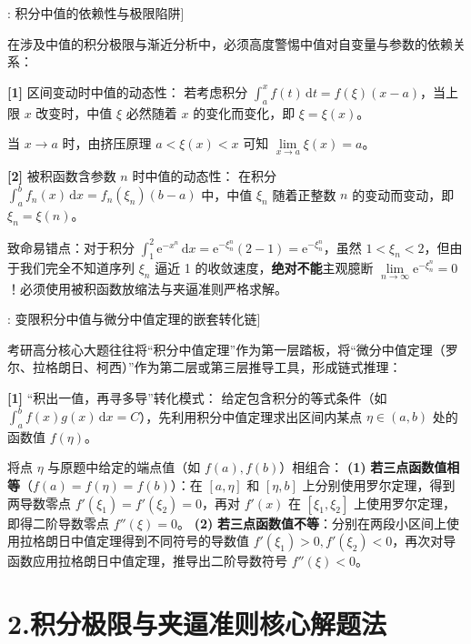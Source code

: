 \documentclass[11pt,a4paper,UTF8]{ctexart}
\begin{document}
\begin{thmbox}[辨析[1]: 积分中值的依赖性与极限陷阱]

在涉及中值的积分极限与渐近分析中，必须高度警惕中值对自变量与参数的依赖关系：

\textbf{[1]} 区间变动时中值的动态性：
若考虑积分 $\int_a^x f(t)\,\mathrm{d}t = f(\xi)(x - a)$，当上限 $x$ 改变时，中值 $\xi$ 必然随着 $x$ 的变化而变化，即 $\xi = \xi(x)$。

当 $x \to a$ 时，由挤压原理 $a < \xi(x) < x$ 可知 $\lim\limits_{x \to a}\xi(x) = a$。

\textbf{[2]} 被积函数含参数 $n$ 时中值的动态性：
在积分 $\int_a^b f_n(x)\,\mathrm{d}x = f_n(\xi_n)(b-a)$ 中，中值 $\xi_n$ 随着正整数 $n$ 的变动而变动，即 $\xi_n = \xi(n)$。

致命易错点：对于积分 $\int_1^2 \mathrm{e}^{-x^n}\,\mathrm{d}x = \mathrm{e}^{-\xi_n^n}(2-1) = \mathrm{e}^{-\xi_n^n}$，虽然 $1 < \xi_n < 2$，但由于我们完全不知道序列 $\xi_n$ 逼近 1 的收敛速度，\textbf{绝对不能}主观臆断 $\lim\limits_{n\to\infty}\mathrm{e}^{-\xi_n^n} = 0$！必须使用被积函数放缩法与夹逼准则严格求解。

\end{thmbox}
\begin{thmbox}[模型[1]: 变限积分中值与微分中值定理的嵌套转化链]

考研高分核心大题往往将“积分中值定理”作为第一层踏板，将“微分中值定理（罗尔、拉格朗日、柯西）”作为第二层或第三层推导工具，形成链式推理：

\textbf{[1]} “积出一值，再寻多导”转化模式：
给定包含积分的等式条件（如 $\int_a^b f(x)g(x)\,\mathrm{d}x = C$），先利用积分中值定理求出区间内某点 $\eta \in (a, b)$ 处的函数值 $f(\eta)$。

将点 $\eta$ 与原题中给定的端点值（如 $f(a), f(b)$）相组合：
\textbf{(1)}  \textbf{若三点函数值相等}（$f(a) = f(\eta) = f(b)$）：在 $[a, \eta]$ 和 $[\eta, b]$ 上分别使用罗尔定理，得到两导数零点 $f'(\xi_1) = f'(\xi_2) = 0$，再对 $f'(x)$ 在 $[\xi_1, \xi_2]$ 上使用罗尔定理，即得二阶导数零点 $f''(\xi) = 0$。
\textbf{(2)}  \textbf{若三点函数值不等}：分别在两段小区间上使用拉格朗日中值定理得到不同符号的导数值 $f'(\xi_1) > 0, f'(\xi_2) < 0$，再次对导函数应用拉格朗日中值定理，推导出二阶导数符号 $f''(\xi) < 0$。

\end{thmbox}

\section{2.积分极限与夹逼准则核心解题法}
\end{document}
